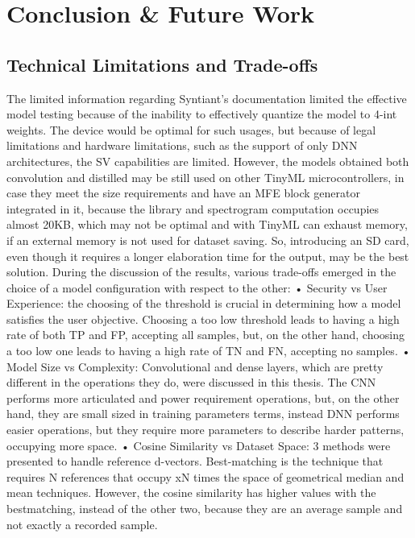 \chapter{Conclusion \& Future Work}
\label{cha:conclusion}

\section{Technical Limitations and Trade-offs}
\label{sec:technical limits and trade-offs}
The limited information regarding Syntiant's documentation limited the effective model testing because of the inability to effectively quantize the model to 4-int weights. The device would be optimal for such usages, but because of legal limitations and hardware limitations, such as the support of only DNN architectures, the SV capabilities are limited. However, the models obtained both convolution and distilled may be still used on other TinyML microcontrollers, in case they meet the size requirements and have an MFE block generator integrated in it, because the library and spectrogram computation occupies almost 20KB, which may not be optimal and with TinyML can exhaust memory, if an external memory is not used for dataset saving. So, introducing an SD card, even though it requires a longer elaboration time for the output, may be the best solution.\newline
During the discussion of the results, various trade-offs emerged in the choice of a model configuration with respect to the other:\newline
• Security vs User Experience: the choosing of the threshold is crucial in determining how a model satisfies the user objective. Choosing a too low threshold leads to having a high rate of both TP and FP, accepting all samples, but, on the other hand, choosing a too low one leads to having a high rate of TN and FN, accepting no samples.\newline 
• Model Size vs Complexity: Convolutional and dense layers, which are pretty different in the operations they do, were discussed in this thesis. The CNN performs more articulated and power requirement operations, but, on the other hand, they are small sized in training parameters terms, instead DNN performs easier operations, but they require more parameters to describe harder patterns, occupying more space.\newline
• Cosine Similarity vs Dataset Space: 3 methods were presented to handle reference d-vectors. Best-matching is the technique that requires N references that occupy xN times the space of geometrical median and mean techniques. However, the cosine similarity has higher values with the bestmatching, instead of the other two, because they are an average sample and not exactly a recorded sample.\newline

